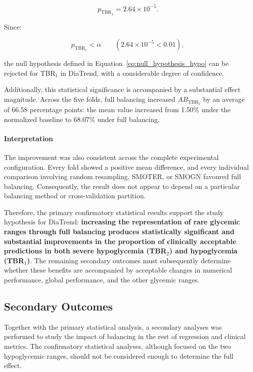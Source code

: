 \begin{equation}
p_{\mathrm{TBR_1}}
=
2.64 \times 10^{-5}.
\end{equation}

Since:

\begin{equation}
p_{\mathrm{TBR_1}} < \alpha
\qquad
(2.64 \times 10^{-5} < 0.01),
\end{equation}

the null hypothesis defined in Equation~\ref{eq:null_hypothesis_hypo} can be rejected for TBR$_1$ in DiaTrend, with a considerable degree of confidence.

Additionally, this statistical significance is accompanied by a substantial effect magnitude. Across the five folds, full balancing increased $AB_{\mathrm{TBR_1}}$ by an average of 66.58 percentage points: the mean value increased from 1.50\% under the normalized baseline to 68.07\% under full balancing.

\paragraph{Interpretation}

The improvement was also consistent across the complete experimental configuration. Every fold showed a positive mean difference, and every individual comparison involving random resampling, SMOTER, or SMOGN favoured full balancing. Consequently, the result does not appear to depend on a particular balancing method or cross-validation partition.

Therefore, the primary confirmatory statistical results support the study hypothesis for DiaTrend: \textbf{increasing the representation of rare glycemic ranges through full balancing produces statistically significant and substantial improvements in the proportion of clinically acceptable predictions in both severe hypoglycemia (TBR$_2$) and hypoglycemia (TBR$_1$)}. The remaining secondary outcomes must subsequently determine whether these benefits are accompanied by acceptable changes in numerical performance, global performance, and the other glycemic ranges.

\subsection{Secondary Outcomes}
\label{subsec:diatrend_secondary_outcomes}

Together with the primary statistical analysis, a secondary analyses was performed to study the impact of balancing in the rest of regression and clinical metrics. The confirmatory statistical analyses, although focused on the two hypoglycemic ranges, should not be considered enough to determine the full effect.

